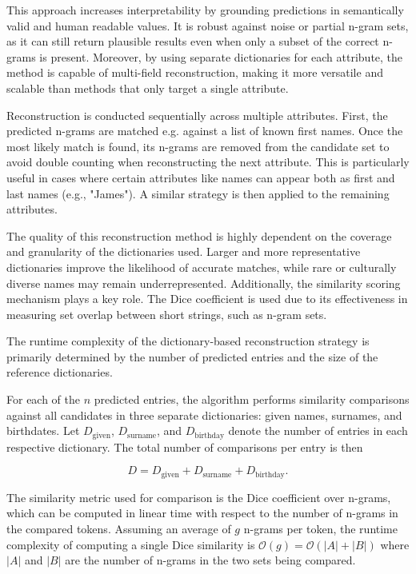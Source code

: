This approach increases interpretability by grounding predictions in semantically valid and human readable values.
It is robust against noise or partial n-gram sets, as it can still return plausible results even when only a subset of the correct n-grams is present.
Moreover, by using separate dictionaries for each attribute, the method is capable of multi-field reconstruction, making it more versatile and scalable than methods that only target a single attribute.

Reconstruction is conducted sequentially across multiple attributes.
First, the predicted n-grams are matched e.g. against a list of known first names.
Once the most likely match is found, its n-grams are removed from the candidate set to avoid double counting when reconstructing the next attribute.
This is particularly useful in cases where certain attributes like names can appear both as first and last names (e.g., "James").
A similar strategy is then applied to the remaining attributes.

The quality of this reconstruction method is highly dependent on the coverage and granularity of the dictionaries used.
Larger and more representative dictionaries improve the likelihood of accurate matches, while rare or culturally diverse names may remain underrepresented.
Additionally, the similarity scoring mechanism plays a key role.
The Dice coefficient is used due to its effectiveness in measuring set overlap between short strings, such as n-gram sets.

The runtime complexity of the dictionary-based reconstruction strategy is primarily determined by the number of predicted entries and the size of the reference dictionaries.

For each of the \( n \) predicted entries, the algorithm performs similarity comparisons against all candidates in three separate dictionaries: given names, surnames, and birthdates. Let \( D_{\text{given}} \), \( D_{\text{surname}} \), and \( D_{\text{birthday}} \) denote the number of entries in each respective dictionary. The total number of comparisons per entry is then

\[
D = D_{\text{given}} + D_{\text{surname}} + D_{\text{birthday}}.
\]

The similarity metric used for comparison is the Dice coefficient over n-grams, which can be computed in linear time with respect to the number of n-grams in the compared tokens. Assuming an average of \( g \) n-grams per token, the runtime complexity of computing a single Dice similarity is \( \mathcal{O}(g) = \mathcal{O}(|A| + |B|) \) where \( |A| \) and \( |B| \) are the number of n-grams in the two sets being compared.


